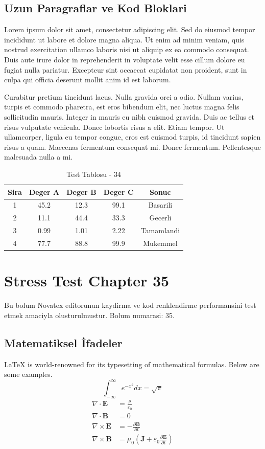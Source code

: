 \documentclass[12pt,a4paper]{article}
\begin{document}
\subsection{Uzun Paragraflar ve Kod Bloklari}
Lorem ipsum dolor sit amet, consectetur adipiscing elit. Sed do eiusmod tempor incididunt ut labore et dolore magna aliqua. Ut enim ad minim veniam, quis nostrud exercitation ullamco laboris nisi ut aliquip ex ea commodo consequat. Duis aute irure dolor in reprehenderit in voluptate velit esse cillum dolore eu fugiat nulla pariatur. Excepteur sint occaecat cupidatat non proident, sunt in culpa qui officia deserunt mollit anim id est laborum.

Curabitur pretium tincidunt lacus. Nulla gravida orci a odio. Nullam varius, turpis et commodo pharetra, est eros bibendum elit, nec luctus magna felis sollicitudin mauris. Integer in mauris eu nibh euismod gravida. Duis ac tellus et risus vulputate vehicula. Donec lobortis risus a elit. Etiam tempor. Ut ullamcorper, ligula eu tempor congue, eros est euismod turpis, id tincidunt sapien risus a quam. Maecenas fermentum consequat mi. Donec fermentum. Pellentesque malesuada nulla a mi.

\begin{table}[h!]
\centering
\begin{tabular}{|c|c|c|c|c|}
\hline
\textbf{Sira} & \textbf{Deger A} & \textbf{Deger B} & \textbf{Deger C} & \textbf{Sonuc} \\
\hline
1 & 45.2 & 12.3 & 99.1 & Basarili \\
2 & 11.1 & 44.4 & 33.3 & Gecerli \\
3 & 0.99 & 1.01 & 2.22 & Tamamlandi \\
4 & 77.7 & 88.8 & 99.9 & Mukemmel \\
\hline
\end{tabular}
\caption{Test Tablosu - 34}
\end{table}

\newpage
\section{Stress Test Chapter 35}
Bu bolum Novatex editorunun kaydirma ve kod renklendirme performansini test etmek amaciyla olusturulmustur. Bolum numarasi: 35.

\subsection{Matematiksel İfadeler}
\LaTeX{} is world-renowned for its typesetting of mathematical formulas. Below are some examples.
\begin{equation}
\int_{-\infty}^{\infty} e^{-x^2} dx = \sqrt{\pi}
\end{equation}
\begin{align}
\nabla \cdot \mathbf{E} &= \frac{\rho}{\varepsilon_0} \\
\nabla \cdot \mathbf{B} &= 0 \\
\nabla \times \mathbf{E} &= -\frac{\partial \mathbf{B}}{\partial t} \\
\nabla \times \mathbf{B} &= \mu_0\left(\mathbf{J} + \varepsilon_0 \frac{\partial \mathbf{E}}{\partial t}\right)
\end{align}
\end{document}
